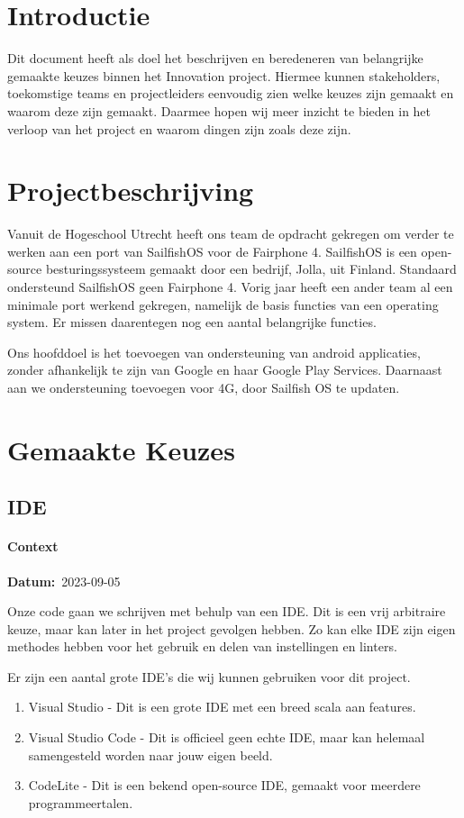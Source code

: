 \documentclass[a4paper]{report}
\newcommand{\personalbox}{
  \begin{tcolorbox}[hbox, colback=green!5!white,colframe=green!75!black,
    left=.1mm, right=.1mm, top=.1mm, bottom=.1mm, fontupper=\scriptsize\sffamily]
    Persoonlijke Keuze
  \end{tcolorbox}
}
\newcommand{\personalchoice}[1]{
  \section[ #1 ]{#1~\mbox{\raisebox{-2.5pt}{\personalbox}}}
}
\newcommand{\timestamp}[1]{
  \mbox{\scriptsize \textbf{Datum:} #1} \smallbreak
}
\begin{document}
\chapter{Introductie}
Dit document heeft als doel het beschrijven en beredeneren van belangrijke gemaakte keuzes binnen het Innovation project. 
Hiermee kunnen stakeholders, toekomstige teams en projectleiders eenvoudig zien welke keuzes zijn gemaakt en waarom deze zijn gemaakt.
Daarmee hopen wij meer inzicht te bieden in het verloop van het project en waarom dingen zijn zoals deze zijn.
\vspace{1.5cm}

\begingroup
\let\clearpage\relax
\chapter{Projectbeschrijving}
Vanuit de Hogeschool Utrecht heeft ons team de opdracht gekregen om verder te werken aan een port van SailfishOS voor de Fairphone 4.
SailfishOS is een open-source besturingssysteem gemaakt door een bedrijf, Jolla, uit Finland. Standaard ondersteund SailfishOS geen Fairphone 4.
Vorig jaar heeft een ander team al een minimale port werkend gekregen, namelijk de basis functies van een operating system. Er missen daarentegen nog een aantal belangrijke functies.
\par \smallskip
Ons hoofddoel is het toevoegen van ondersteuning van android applicaties, zonder afhankelijk te zijn van Google en haar Google Play Services\texttrademark. 
Daarnaast aan we ondersteuning toevoegen voor 4G, door Sailfish OS te updaten.
\endgroup

\chapter{Gemaakte Keuzes}
\personalchoice{IDE}
\subsubsection{Context}
\timestamp{2023-09-05}
Onze code gaan we schrijven met behulp van een IDE. Dit is een vrij arbitraire keuze, maar kan later in het project gevolgen hebben. 
Zo kan elke IDE zijn eigen methodes hebben voor het gebruik en delen van instellingen en linters. 
\par\smallskip
Er zijn een aantal grote IDE's die wij kunnen gebruiken voor dit project. 
\begin{enumerate}
  \item Visual Studio - Dit is een grote IDE met een breed scala aan features.
  \item Visual Studio Code - Dit is officieel geen echte IDE, maar kan helemaal samengesteld worden naar jouw eigen beeld. 
  \item CodeLite - Dit is een bekend open-source IDE, gemaakt voor meerdere programmeertalen. 
\end{enumerate}
\end{document}
